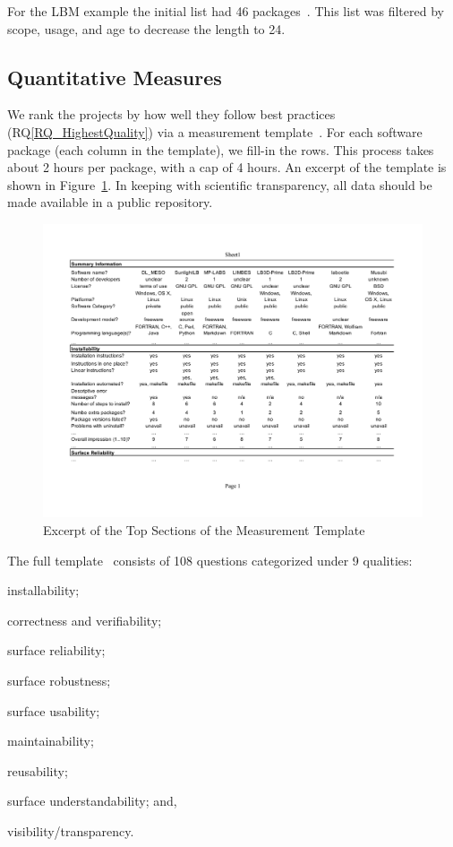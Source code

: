 \documentclass[runningheads]{llncs}
\newcommand{\rqref}[1]{RQ\ref{#1}}
\begin{document}
For the LBM example the initial list had 46 packages~\cite{Michalski2021}. This
list was filtered by scope, usage, and age to decrease the length to 24.

\subsection{Quantitative Measures} \label{empiricalmeasures}

We rank the projects by how well they follow best practices
(\rqref{RQ_HighestQuality}) via a measurement template~\cite{SmithEtAl2021}. For
each software package (each column in the template), we fill-in the rows. This
process takes about 2 hours per package, with a cap of 4 hours.  An excerpt of
the template is shown in Figure~\ref{measurement_template_image}.  In keeping
with scientific transparency, all data should be made available in a public
repository.

\begin{figure}[!ht]
	\begin{center}
	  \includegraphics[width=1.0\textwidth]{./figures/measurement_template.pdf}
	  \caption{Excerpt of the Top Sections of the Measurement Template}
	  \label{measurement_template_image}
	\end{center}
\end{figure}

The full template~\cite{SmithEtAl2021} consists of 108 questions categorized
under 9 qualities:
\begin{inparaenum}[(i)]
	\item installability;
	\item correctness and verifiability;
	\item surface reliability;
	\item surface robustness;
	\item surface usability;
	\item maintainability;
	\item reusability;
	\item surface understandability; and,
	\item visibility/transparency. 
\end{inparaenum} 
\end{document}
